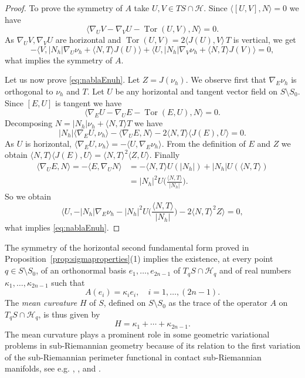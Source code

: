 \documentclass[10pt]{amsart}
\theoremstyle{definition}
\theoremstyle{remark}
\numberwithin{equation}{section}
\begin{document}
\begin{proof}
To prove the symmetry of $A$ take $U, V\in TS\cap{\mathcal{H}}$. Since ${\langle{[U,V],N}\rangle}=0$ we have
\[
{\langle{\nabla_UV-\nabla_VU-\operatorname{Tor}(U,V),N}\rangle}=0.
\]
As $\nabla_UV,\nabla_VU$ are horizontal and $\operatorname{Tor}(U,V)=2{\langle{J(U),V}\rangle}\,T$ is vertical, we get
\[
-{\langle{V,{|N_{h}|}\nabla_U{\nu_{h}}+{\langle{N,T}\rangle}J(U)}\rangle}+{\langle{U,{|N_{h}|}\nabla_V{\nu_{h}}+{\langle{N,T}\rangle}J(V)}\rangle}=0,
\]
what implies the symmetry of $A$.

Let us now prove \eqref{eq:nablaEnuh}. Let $Z=J({\nu_{h}})$. We observe first that $\nabla_E{\nu_{h}}$ is orthogonal to ${\nu_{h}}$ and $T$. Let $U$ be any horizontal and tangent vector field on $S\setminus S_0$. Since $[E,U]$ is tangent we have
\[
{\langle{\nabla_EU-\nabla_UE-\operatorname{Tor}(E,U),N}\rangle}=0.
\]
Decomposing $N={|N_{h}|}{\nu_{h}}+{\langle{N,T}\rangle}T$ we have
\[
{|N_{h}|}{\langle{\nabla_EU,{\nu_{h}}}\rangle}-{\langle{\nabla_UE,N}\rangle}-2{\langle{N,T}\rangle}{\langle{J(E),U}\rangle}=0.
\]
As $U$ is horizontal, ${\langle{\nabla_EU,{\nu_{h}}}\rangle}=-{\langle{U,\nabla_E{\nu_{h}}}\rangle}$. From the definition of $E$ and $Z$ we obtain ${\langle{N,T}\rangle}{\langle{J(E),U}\rangle}={\langle{N,T}\rangle}^2{\langle{Z,U}\rangle}$. Finally
\begin{align*}
{\langle{\nabla_UE,N}\rangle}=-{\langle{E,\nabla_UN}\rangle}&=-{\langle{N,T}\rangle}U({|N_{h}|})+{|N_{h}|} U({\langle{N,T}\rangle})
\\
&={|N_{h}|}^2U\bigg({\frac{{\langle{N,T}\rangle}}{|N_h|}}\bigg).
\end{align*}
So we obtain
\[
{\langle{U,-{|N_{h}|}\nabla_E{\nu_{h}}-{|N_{h}|}^2U\bigg({\frac{{\langle{N,T}\rangle}}{|N_h|}}\bigg)-2{\langle{N,T}\rangle}^2Z}\rangle}=0,
\]
what implies \eqref{eq:nablaEnuh}.
\end{proof}

The symmetry of the horizontal second fundamental form proved in Proposition~\ref{prop:sigmaproperties}(1) implies the existence, at every point $q\in S\setminus S_0$, of an orthonormal basis $e_1,\ldots,e_{2n-1}$ of $T_qS\cap{\mathcal{H}}_q$ and of real numbers $\kappa_1,\ldots,\kappa_{2n-1}$ such that
\[
A(e_i)=\kappa_ie_i,\quad i=1,\ldots, (2n-1).
\]
The \emph{mean curvature} $H$ of $S$, defined on $S\setminus S_0$ as the trace of the operator $A$ on $T_qS\cap{\mathcal{H}}_q$, is thus given by
\[
H=\kappa_1+\cdots +\kappa_{2n-1}.
\]
The mean curvature plays a prominent role in some geometric variational problems in sub-Riemannian geometry because of its relation to the first variation of the sub-Riemannian perimeter functional in contact sub-Riemannian manifolds, see e.g. \cite{MR2435652}, \cite{MR3044134}, and \cite{MR2898770}.
\end{document}
